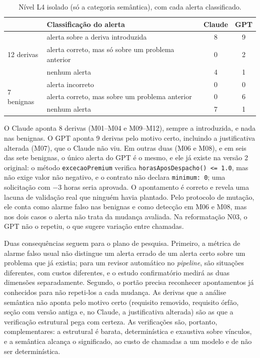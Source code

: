 \documentclass[12pt]{article}
\newcommand{\code}[1]{\texttt{#1}}
\begin{document}
\begin{table}[!ht]
\centering
\caption{Nível L4 isolado (só a categoria semântica), com cada alerta classificado.}
\label{tab:l4}
\small
\begin{tabular}{l l c c}
\toprule
 & \textbf{Classificação do alerta} & \textbf{Claude} & \textbf{GPT} \\
\midrule
\multirow{3}{*}{12 derivas} & alerta sobre a deriva introduzida & 8 & 9 \\
 & alerta correto, mas só sobre um problema anterior & 0 & 2 \\
 & nenhum alerta & 4 & 1 \\
\midrule
\multirow{3}{*}{7 benignas} & alerta incorreto & 0 & 0 \\
 & alerta correto, mas sobre um problema anterior & 0 & 6 \\
 & nenhum alerta & 7 & 1 \\
\bottomrule
\end{tabular}
\end{table}

O Claude aponta 8 derivas (M01--M04 e M09--M12), sempre a introduzida, e nada nas benignas. O GPT aponta 9 derivas pelo motivo certo, incluindo a justificativa alterada (M07), que o Claude não viu. Em outras duas (M06 e M08), e em seis das sete benignas, o único alerta do GPT é o mesmo, e ele já existe na versão 2 original: o método \code{excecaoPremium} verifica \code{horasAposDespacho() <= 1.0}, mas não exige valor não negativo, e o contrato não declara \code{minimum: 0}; uma solicitação com $-3$ horas seria aprovada. O apontamento é correto e revela uma lacuna de validação real que ninguém havia plantado. Pelo protocolo de mutação, ele conta como alarme falso nas benignas e como detecção em M06 e M08, mas nos dois casos o alerta não trata da mudança avaliada. Na reformatação N03, o GPT não o repetiu, o que sugere variação entre chamadas.

Duas consequências seguem para o plano de pesquisa. Primeiro, a métrica de alarme falso usual não distingue um alerta errado de um alerta certo sobre um problema que já existia; para um revisor automático no \textit{pipeline}, são situações diferentes, com custos diferentes, e o estudo confirmatório medirá as duas dimensões separadamente. Segundo, o portão precisa reconhecer apontamentos já conhecidos para não repeti-los a cada mudança. As derivas que a análise semântica não aponta pelo motivo certo (requisito removido, requisito órfão, seção com versão antiga e, no Claude, a justificativa alterada) são as que a verificação estrutural pega com certeza. As verificações são, portanto, complementares: a estrutural é barata, determinística e exaustiva sobre vínculos, e a semântica alcança o significado, ao custo de chamadas a um modelo e de não ser determinística.
\end{document}

